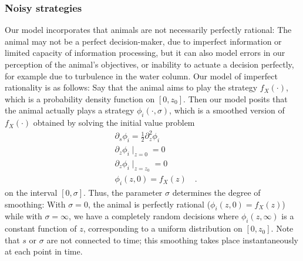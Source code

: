 



\subsubsection*{Noisy strategies}
Our model incorporates that animals are not necessarily perfectly rational: The animal may not be a perfect decision-maker, due to imperfect information or limited capacity of information processing, but it can also model errors in our perception of the animal's objectives, or inability to actuate a decision perfectly, for example due to turbulence in the water column. Our model of imperfect rationality is as follows: Say that the animal aims to play the strategy $f_X(\cdot)$, which is a probability density function on $[0,z_0]$. Then our model posits that the animal actually plays a strategy $\phi_i(\cdot ,\sigma)$, which is a smoothed version of $f_X(\cdot)$ obtained by solving the initial value problem
\begin{align}
  \label{eq:density_PDE}
  &\partial_s \phi_i = \frac{1}{2}\partial_z^2 \phi_i \\
  &\partial_z \phi_i \mid_{z=0} = 0 \\
  &\partial_z \phi_i \mid_{z = z_0} = 0 \\
  & \phi_i(z,0) = f_X(z) \quad .
\end{align}
on the interval $[0,\sigma]$. Thus, the parameter $\sigma$ determines the degree of smoothing: With $\sigma=0$, the animal is perfectly rational ($\phi_i(z,0)=f_X(z)$) while with $\sigma=\infty$, we have a completely random decisions where $\phi_i(z,\infty)$ is a constant function of $z$, corresponding to a uniform distribution on $[0,z_0]$. Note that $s$ or $\sigma$ are not connected to time; this smoothing takes place instantaneously at each point in time.

